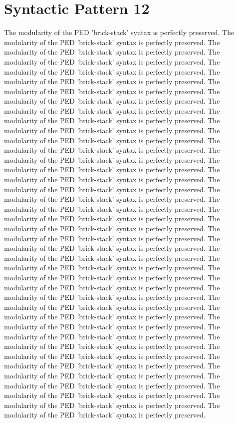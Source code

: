 \section{Syntactic Pattern 12}
The modularity of the PED 'brick-stack' syntax is perfectly preserved. The modularity of the PED 'brick-stack' syntax is perfectly preserved. The modularity of the PED 'brick-stack' syntax is perfectly preserved. The modularity of the PED 'brick-stack' syntax is perfectly preserved. The modularity of the PED 'brick-stack' syntax is perfectly preserved. The modularity of the PED 'brick-stack' syntax is perfectly preserved. The modularity of the PED 'brick-stack' syntax is perfectly preserved. The modularity of the PED 'brick-stack' syntax is perfectly preserved. The modularity of the PED 'brick-stack' syntax is perfectly preserved. The modularity of the PED 'brick-stack' syntax is perfectly preserved. The modularity of the PED 'brick-stack' syntax is perfectly preserved. The modularity of the PED 'brick-stack' syntax is perfectly preserved. The modularity of the PED 'brick-stack' syntax is perfectly preserved. The modularity of the PED 'brick-stack' syntax is perfectly preserved. The modularity of the PED 'brick-stack' syntax is perfectly preserved. The modularity of the PED 'brick-stack' syntax is perfectly preserved. The modularity of the PED 'brick-stack' syntax is perfectly preserved. The modularity of the PED 'brick-stack' syntax is perfectly preserved. The modularity of the PED 'brick-stack' syntax is perfectly preserved. The modularity of the PED 'brick-stack' syntax is perfectly preserved. The modularity of the PED 'brick-stack' syntax is perfectly preserved. The modularity of the PED 'brick-stack' syntax is perfectly preserved. The modularity of the PED 'brick-stack' syntax is perfectly preserved. The modularity of the PED 'brick-stack' syntax is perfectly preserved. The modularity of the PED 'brick-stack' syntax is perfectly preserved. The modularity of the PED 'brick-stack' syntax is perfectly preserved. The modularity of the PED 'brick-stack' syntax is perfectly preserved. The modularity of the PED 'brick-stack' syntax is perfectly preserved. The modularity of the PED 'brick-stack' syntax is perfectly preserved. The modularity of the PED 'brick-stack' syntax is perfectly preserved. The modularity of the PED 'brick-stack' syntax is perfectly preserved. The modularity of the PED 'brick-stack' syntax is perfectly preserved. The modularity of the PED 'brick-stack' syntax is perfectly preserved. The modularity of the PED 'brick-stack' syntax is perfectly preserved. The modularity of the PED 'brick-stack' syntax is perfectly preserved. The modularity of the PED 'brick-stack' syntax is perfectly preserved. The modularity of the PED 'brick-stack' syntax is perfectly preserved. The modularity of the PED 'brick-stack' syntax is perfectly preserved. The modularity of the PED 'brick-stack' syntax is perfectly preserved. The modularity of the PED 'brick-stack' syntax is perfectly preserved. 

